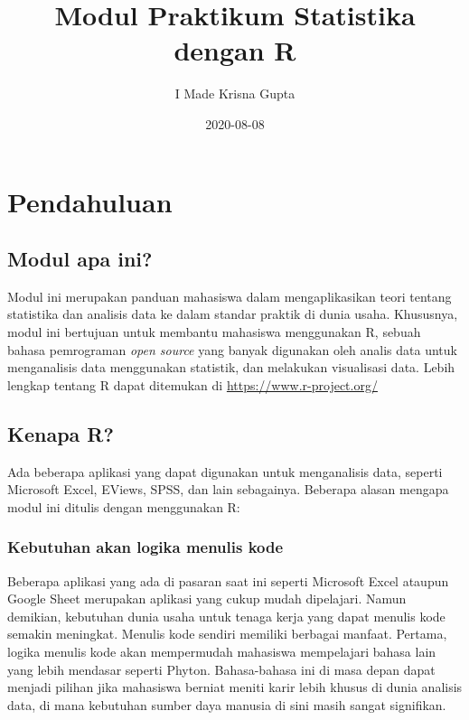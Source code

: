 \documentclass[
]{book}
\title{Modul Praktikum Statistika dengan R}
\author{I Made Krisna Gupta}
\date{2020-08-08}
\begin{document}
\maketitle

{
\setcounter{tocdepth}{1}
\tableofcontents
}
\hypertarget{pendahuluan}{%
\chapter{Pendahuluan}\label{pendahuluan}}

\hypertarget{modul-apa-ini}{%
\section{Modul apa ini?}\label{modul-apa-ini}}

Modul ini merupakan panduan mahasiswa dalam mengaplikasikan teori tentang statistika dan analisis data ke dalam standar praktik di dunia usaha. Khususnya, modul ini bertujuan untuk membantu mahasiswa menggunakan R, sebuah bahasa pemrograman \emph{open source} yang banyak digunakan oleh analis data untuk menganalisis data menggunakan statistik, dan melakukan visualisasi data. Lebih lengkap tentang R dapat ditemukan di \url{https://www.r-project.org/}

\hypertarget{kenapa-r}{%
\section{Kenapa R?}\label{kenapa-r}}

Ada beberapa aplikasi yang dapat digunakan untuk menganalisis data, seperti Microsoft Excel, EViews, SPSS, dan lain sebagainya. Beberapa alasan mengapa modul ini ditulis dengan menggunakan R:

\hypertarget{kebutuhan-akan-logika-menulis-kode}{%
\subsection{Kebutuhan akan logika menulis kode}\label{kebutuhan-akan-logika-menulis-kode}}

Beberapa aplikasi yang ada di pasaran saat ini seperti Microsoft Excel ataupun Google Sheet merupakan aplikasi yang cukup mudah dipelajari. Namun demikian, kebutuhan dunia usaha untuk tenaga kerja yang dapat menulis kode semakin meningkat. Menulis kode sendiri memiliki berbagai manfaat. Pertama, logika menulis kode akan mempermudah mahasiswa mempelajari bahasa lain yang lebih mendasar seperti Phyton. Bahasa-bahasa ini di masa depan dapat menjadi pilihan jika mahasiswa berniat meniti karir lebih khusus di dunia analisis data, di mana kebutuhan sumber daya manusia di sini masih sangat signifikan.
\end{document}
